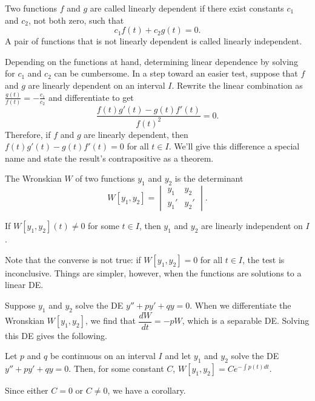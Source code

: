 \documentclass[../m082main.tex]{subfiles}
\begin{document}
\begin{definition}
    Two functions $f$ and $g$ are called linearly dependent if there exist constants $c_1$ and $c_2$, not both zero, such that
    \[ c_1f(t) + c_2g(t) = 0. \]
    A pair of functions that is not linearly dependent is called linearly independent.
\end{definition}

Depending on the functions at hand, determining linear dependence by solving for $c_1$ and $c_2$ can be cumbersome.
In a step toward an easier test, suppose that $f$ and $g$ are linearly dependent on an interval $I$.
Rewrite the linear combination as $\displaystyle \frac{g(t)}{f(t)} = -\frac{c_1}{c_2}$ and differentiate to get
\[ \frac{f(t)g'(t) - g(t)f'(t)}{f(t)^2} = 0. \]
Therefore, if $f$ and $g$ are linearly dependent, then $f(t)g'(t) - g(t)f'(t) = 0$ for all $t \in I$.
We'll give this difference a special name and state the result's contrapositive as a theorem.

\begin{definition}[Wronskian]
    The Wronskian $W$ of two functions $y_1$ and $y_2$ is the determinant
    \[ W[y_1, y_2] = \begin{vmatrix} y_1 & y_2 \\ y_1' & y_2' \end{vmatrix}. \]
\end{definition}

\begin{theorem}
    If $W[y_1, y_2](t) \neq 0$ for some $t \in I$, then $y_1$ and $y_2$ are linearly independent on $I$.
\end{theorem}

Note that the converse is not true: if $W[y_1, y_2] = 0$ for all $t \in I$, the test is inconclusive.
Things are simpler, however, when the functions are solutions to a linear DE.

Suppose $y_1$ and $y_2$ solve the DE $y'' + py' + qy = 0$.
When we differentiate the Wronskian $W[y_1, y_2]$, we find that $\dfrac{dW}{dt} = -pW$, which is a separable DE.
Solving this DE gives the following.

\begin{theorem}
    Let $p$ and $q$ be continuous on an interval $I$ and let $y_1$ and $y_2$ solve the DE $y'' + py' + qy = 0$.
    Then, for some constant $C$, $W[y_1, y_2] = Ce^{-\int p(t) dt}$.
\end{theorem}

Since either $C = 0$ or $C \neq 0$, we have a corollary.
\end{document}
